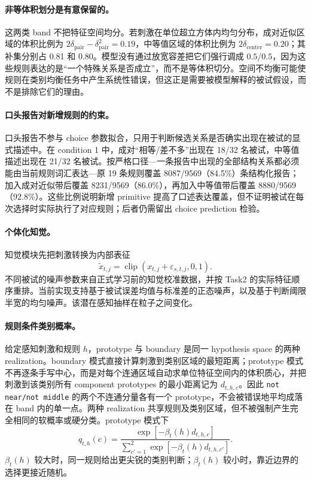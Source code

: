\paragraph{非等体积划分是有意保留的。}
这两类 band 不把特征空间均分。若刺激在单位超立方体内均匀分布，成对近似区域的体积比例为
$2\delta_{\mathrm{pair}}-\delta_{\mathrm{pair}}^2=0.19$，中等值区域的体积比例为 $2\delta_{\mathrm{center}}=0.20$；其补集分别占 0.81 和 0.80。模型没有通过放宽容差把它们强行调成 $0.5/0.5$，因为这些规则表达的是“一个特殊关系是否成立”，而不是等体积切分。空间不均衡可能使规则在类别均衡任务中产生系统性错误，但这正是需要被模型解释的被试假设，而不是排除它们的理由。

\paragraph{口头报告对新增规则的约束。}
口头报告不参与 choice 参数拟合，只用于判断候选关系是否确实出现在被试的显式描述中。在 condition 1 中，成对“相等/差不多”出现在 18/32 名被试，中等值描述出现在 21/32 名被试。按严格口径---一条报告中出现的全部结构关系都必须能由当前规则词汇表达---原 19 条规则覆盖 8087/9569（84.5\%）条结构化报告；加入成对近似带后覆盖 8231/9569（86.0\%），再加入中等值带后覆盖 8880/9569（92.8\%）。这些比例说明新增 primitive 提高了口述表达覆盖，但不证明被试在每次选择时实际执行了对应规则；后者仍需留出 choice prediction 检验。

\paragraph{个体化知觉。}
知觉模块先把刺激转换为内部表征
\begin{equation}
\widetilde x_{t,j}
=\operatorname{clip}(x_{t,j}+\varepsilon_{s,t,j},0,1).
\label{eq:model0811-perception}
\end{equation}
不同被试的噪声参数来自正式学习前的知觉校准数据，并按 Task2 的实际特征顺序重排。当前实现支持基于被试误差均值与标准差的正态噪声，以及基于判断阈限半宽的均匀噪声。该潜在感知抽样在粒子之间变化。

\paragraph{规则条件类别概率。}
给定感知刺激和规则 $h$，prototype 与 boundary 是同一 hypothesis space 的两种 realization。boundary 模式直接计算刺激到类别区域的最短距离；prototype 模式不再逐条手写中心，而是对每个连通区域自动求单位特征空间内的体积质心，并把刺激到该类别所有 component prototypes 的最小距离记为 $d_{t,h,c}$。因此 \texttt{not near/not middle} 的两个不连通分量各有一个 prototype，不会被错误地平均成落在 band 内的单一点。两种 realization 共享规则及类别区域，但不被强制产生完全相同的软概率或硬分类。prototype 模式下
\begin{equation}
q_{t,h}(c)
=
\frac{\exp[-\beta_t(h)d_{t,h,c}]}
{\sum_{c'=1}^{2}\exp[-\beta_t(h)d_{t,h,c'}]}.
\label{eq:model0811-rule-choice}
\end{equation}
$\beta_t(h)$ 较大时，同一规则给出更尖锐的类别判断；$\beta_t(h)$ 较小时，靠近边界的选择更接近随机。

